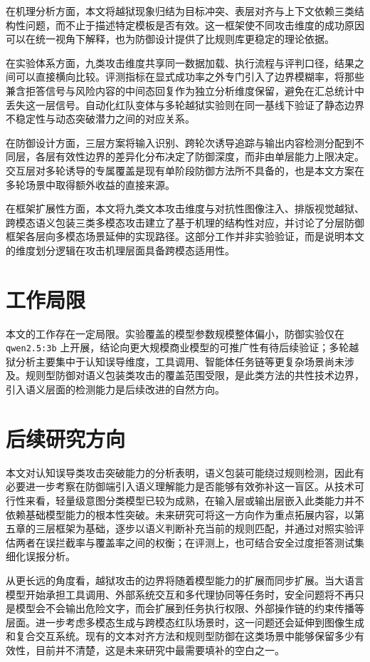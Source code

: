 在机理分析方面，本文将越狱现象归结为目标冲突、表层对齐与上下文依赖三类结构性问题，而不止于描述特定模板是否有效。这一框架使不同攻击维度的成功原因可以在统一视角下解释，也为防御设计提供了比规则库更稳定的理论依据。

在实验体系方面，九类攻击维度共享同一数据加载、执行流程与评判口径，结果之间可以直接横向比较。评测指标在显式成功率之外专门引入了边界模糊率，将那些兼含拒答信号与风险内容的中间态回复作为独立分析维度保留，避免在汇总统计中丢失这一层信号。自动化红队变体与多轮越狱实验则在同一基线下验证了静态边界不稳定性与动态突破潜力之间的对应关系。

在防御设计方面，三层方案将输入识别、跨轮次诱导追踪与输出内容检测分配到不同层，各层有效性边界的差异化分布决定了防御深度，而非由单层能力上限决定。交互层对多轮诱导的专属覆盖是现有单阶段防御方法所不具备的，也是本文方案在多轮场景中取得额外收益的直接来源。

在框架扩展性方面，本文将九类文本攻击维度与对抗性图像注入、排版视觉越狱、跨模态语义包装三类多模态攻击建立了基于机理的结构性对应，并讨论了分层防御框架各层向多模态场景延伸的实现路径。这部分工作并非实验验证，而是说明本文的维度划分逻辑在攻击机理层面具备跨模态适用性。

\section{工作局限}

本文的工作存在一定局限。实验覆盖的模型参数规模整体偏小，防御实验仅在 \texttt{qwen2.5:3b} 上开展，结论向更大规模商业模型的可推广性有待后续验证；多轮越狱分析主要集中于认知误导维度，工具调用、智能体任务链等更复杂场景尚未涉及。规则型防御对语义包装类攻击的覆盖范围受限，是此类方法的共性技术边界，引入语义层面的检测能力是后续改进的自然方向。

\section{后续研究方向}

本文对认知误导类攻击突破能力的分析表明，语义包装可能绕过规则检测，因此有必要进一步考察在防御端引入语义理解能力是否能够有效弥补这一盲区。从技术可行性来看，轻量级意图分类模型已较为成熟，在输入层或输出层嵌入此类能力并不依赖基础模型能力的根本性突破。未来研究可将这一方向作为重点拓展内容，以第五章的三层框架为基础，逐步以语义判断补充当前的规则匹配，并通过对照实验评估两者在误拦截率与覆盖率之间的权衡；在评测上，也可结合安全过度拒答测试集细化误报分析\cite{rottger2024xstest,chen2024struq}。

从更长远的角度看，越狱攻击的边界将随着模型能力的扩展而同步扩展。当大语言模型开始承担工具调用、外部系统交互和多代理协同等任务时，安全问题将不再只是模型会不会输出危险文字，而会扩展到任务执行权限、外部操作链的约束传播等层面\cite{hagendorff2026jailbreakagents,toyer2024tensortrust}。进一步考虑多模态生成与跨模态红队场景时，这一问题还会延伸到图像生成和复合交互系统\cite{chin2024prompting4debugging}。现有的文本对齐方法和规则型防御在这类场景中能够保留多少有效性，目前并不清楚，这是未来研究中最需要填补的空白之一。

